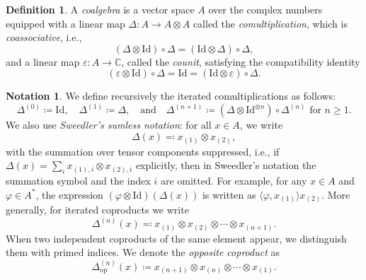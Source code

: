 \documentclass[a4paper,10pt]{amsart}
\newcommand{\eval}[2]{\langle #1 , #2\rangle}
\newcommand{\newterm}[1]{\emph{#1}}
\theoremstyle{definition}
\newtheorem{definition}[theorem]{Definition}
\newtheorem*{notation}{Notation}
\begin{document}
\begin{definition}
\label{def:coalgebra}
A \newterm{coalgebra} is a vector space $A$ over the complex numbers equipped with a linear map $\Delta:A\to A\otimes A$ called the \newterm{comultiplication}, which is \newterm{coassociative}, i.e.,
\begin{equation}
    (\Delta\otimes\mathrm{Id})\circ\Delta =
    (\mathrm{Id}\otimes\Delta)\circ\Delta,
\end{equation}
and a linear map $\varepsilon:A\to \mathbb{C}$, called the \newterm{counit}, satisfying the compatibility identity
\begin{equation}\label{eq:axiom_eps_id}
    (\varepsilon\otimes\mathrm{Id})\circ\Delta
    =
    \mathrm{Id}
    =
    (\mathrm{Id}\otimes\varepsilon)\circ\Delta.
\end{equation}
\end{definition}

\begin{notation}
We define recursively the iterated comultiplications as follows:
\[
    \Delta^{(0)} \coloneqq
        \mathrm{Id}
    , \quad
    \Delta^{(1)} \coloneqq
        \Delta
    ,\quad\text{and}\quad
    \Delta^{(n+1)} \coloneqq
        (\Delta\otimes \mathrm{Id}^{\otimes n})\circ \Delta^{(n)}
        \text{ for }n\geq 1.
\]
We also use \newterm{Sweedler's sumless notation}: for all $x\in A$, we write
\[
    \Delta(x) \eqqcolon x_{(1)}\otimes x_{(2)},
\]
with the summation over tensor components suppressed, i.e., if $\Delta(x)=\sum_i x_{(1),i}\otimes x_{(2),i}$ explicitly, then in Sweedler's notation the summation symbol and the index $i$ are omitted.
For example, for any $x\in A$ and $\varphi\in A^*$, the expression $(\varphi\otimes\mathrm{Id})(\Delta(x))$ is written as $\eval{ \varphi}{x_{(1)}} x_{(2)}$.
More generally, for iterated coproducts we write
\[
    \Delta^{(n)}(x)
    \eqqcolon
    x_{(1)} \otimes x_{(2)} \otimes \cdots \otimes x_{(n+1)}.
\]
When two independent coproducts of the same element appear, we distinguish them with primed indices. We denote the \newterm{opposite coproduct} as
\[
    \Delta^{(n)}_{\mathrm{op}}(x)
    \coloneqq
    x_{(n+1)} \otimes x_{(n)} \otimes \cdots \otimes x_{(1)}.
\]
\end{notation}
\end{document}
